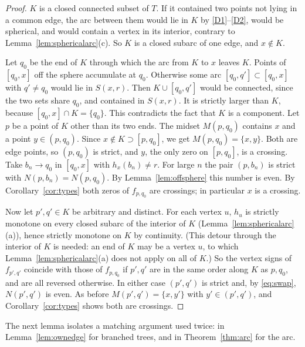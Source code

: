 \documentclass[11pt]{amsart}
\theoremstyle{definition}
\theoremstyle{remark}
\newcommand{\M}{M}
\newcommand{\N}{N}
\begin{document}
\begin{proof}
$K$ is a closed connected subset of $T$. If it contained two points not lying in a common edge, the arc between them would lie in $K$ by \ref{D1}--\ref{D2}, would be spherical, and would contain a vertex in its interior, contrary to Lemma~\ref{lem:sphericalarc}(c). So $K$ is a closed subarc of one edge, and $x\notin K$.

Let $q_0$ be the end of $K$ through which the arc from $K$ to $x$ leaves $K$. Points of $[q_0,x]$ off the sphere accumulate at $q_0$. Otherwise some arc $[q_0,q']\subset[q_0,x]$ with $q'\ne q_0$ would lie in $S(x,r)$. Then $K\cup[q_0,q']$ would be connected, since the two sets share $q_0$, and contained in $S(x,r)$. It is strictly larger than $K$, because $[q_0,x]\cap K=\{q_0\}$. This contradicts the fact that $K$ is a component. Let $p$ be a point of $K$ other than its two ends. The midset $\M(p,q_0)$ contains $x$ and a point $y\in(p,q_0)$. Since $x\notin K\supset[p,q_0]$, we get $\M(p,q_0)=\{x,y\}$. Both are edge points, so $(p,q_0)$ is strict, and $y$, the only zero on $[p,q_0]$, is a crossing. Take $b_n\to q_0$ in $[q_0,x]$ with $h_x(b_n)\ne r$. For large $n$ the pair $(p,b_n)$ is strict with $\N(p,b_n)=\N(p,q_0)$. By Lemma~\ref{lem:offsphere} this number is even. By Corollary~\ref{cor:types} both zeros of $f_{p,q_0}$ are crossings; in particular $x$ is a crossing.

Now let $p',q'\in K$ be arbitrary and distinct. For each vertex $u$, $h_u$ is strictly monotone on every closed subarc of the interior of $K$ (Lemma~\ref{lem:sphericalarc}(a)), hence strictly monotone on $K$ by continuity. (This detour through the interior of $K$ is needed: an end of $K$ may be a vertex $u$, to which Lemma~\ref{lem:sphericalarc}(a) does not apply on all of $K$.) So the vertex signs of $f_{p',q'}$ coincide with those of $f_{p,q_0}$ if $p',q'$ are in the same order along $K$ as $p,q_0$, and are all reversed otherwise. In either case $(p',q')$ is strict and, by \eqref{eq:swap}, $\N(p',q')$ is even. As before $\M(p',q')=\{x,y'\}$ with $y'\in(p',q')$, and Corollary~\ref{cor:types} shows both are crossings.
\end{proof}

The next lemma isolates a matching argument used twice: in Lemma~\ref{lem:ownedge} for branched trees, and in Theorem~\ref{thm:arc} for the arc.
\end{document}
